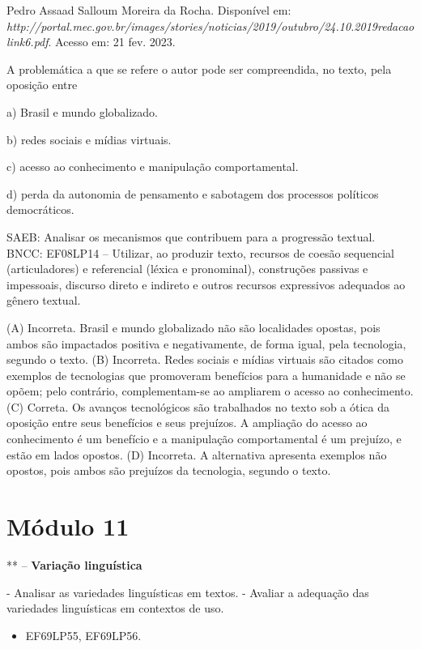 Pedro Assaad Salloum Moreira da Rocha. Disponível em:
\emph{http://portal.mec.gov.br/images/stories/noticias/2019/outubro/24.10.2019redacaolink6.pdf}.
Acesso em: 21 fev. 2023.

A problemática a que se refere o autor pode ser compreendida, no texto,
pela oposição entre

a) Brasil e mundo globalizado.

b) redes sociais e mídias virtuais.

c) acesso ao conhecimento e manipulação comportamental.

d) perda da autonomia de pensamento e sabotagem dos processos políticos
democráticos.

SAEB: Analisar os mecanismos que contribuem para a progressão textual.
BNCC: EF08LP14 -- Utilizar, ao produzir texto, recursos de coesão
sequencial (articuladores) e referencial (léxica e pronominal),
construções passivas e impessoais, discurso direto e indireto e outros
recursos expressivos adequados ao gênero textual.

(A) Incorreta. Brasil e mundo globalizado não são localidades opostas,
pois ambos são impactados positiva e negativamente, de forma igual, pela
tecnologia, segundo o texto. (B) Incorreta. Redes sociais e mídias
virtuais são citados como exemplos de tecnologias que promoveram
benefícios para a humanidade e não se opõem; pelo contrário,
complementam-se ao ampliarem o acesso ao conhecimento. (C) Correta. Os
avanços tecnológicos são trabalhados no texto sob a ótica da oposição
entre seus benefícios e seus prejuízos. A ampliação do acesso ao
conhecimento é um benefício e a manipulação comportamental é um
prejuízo, e estão em lados opostos. (D) Incorreta. A alternativa
apresenta exemplos não opostos, pois ambos são prejuízos da tecnologia,
segundo o texto.


\section{Módulo 11}

** -- \textbf{Variação linguística}


- Analisar as variedades linguísticas em
textos. - Avaliar a adequação das variedades linguísticas em contextos
de uso.


\begin{itemize}
\tightlist
\item
  EF69LP55, EF69LP56.
\end{itemize}

